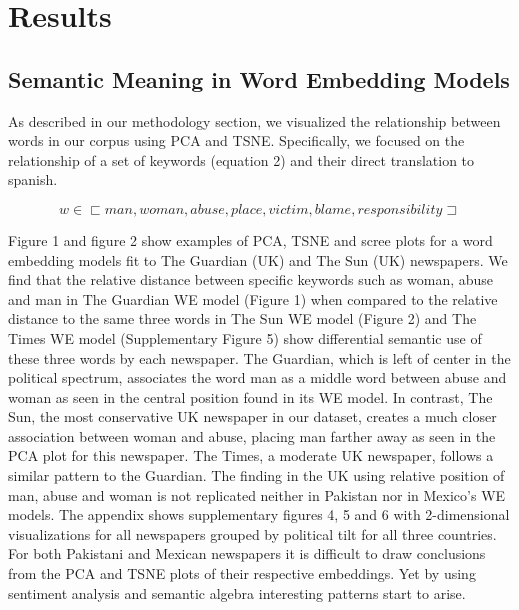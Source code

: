 \documentclass{article}
\begin{document}
\section{Results}{	
\subsection{Semantic Meaning in Word Embedding Models}{
	
As described in our methodology section, we visualized the relationship between words in our corpus using PCA and TSNE. Specifically, we focused on the relationship of a set of keywords (equation 2) and their direct translation to spanish. 

\begin{equation} \label{eu_eqn}
	w \in \sqsubset  {man, woman, abuse, place, victim, blame, responsibility} \sqsupset
\end{equation}

Figure 1 and figure 2 show examples of PCA, TSNE and scree plots for a word embedding models fit to The Guardian (UK) and The Sun (UK) newspapers. We find that the relative distance between specific keywords such as woman, abuse and man in The Guardian WE model (Figure 1) when compared to the relative distance to the same three words in The Sun WE model (Figure 2) and The Times WE model (Supplementary Figure 5) show differential semantic use of these three words by each newspaper. The Guardian, which is left of center in the political spectrum, associates the word man as a middle word between abuse and woman as seen in the central position found in its WE model. In contrast, The Sun, the most conservative  UK newspaper in our dataset, creates a much closer association between woman and abuse, placing man farther away as seen in the PCA plot for this newspaper. The Times, a moderate UK newspaper, follows a similar pattern to the Guardian. The finding in the UK using relative position of man, abuse and woman is not replicated neither in Pakistan nor in Mexico’s WE models. The appendix shows supplementary figures 4, 5 and 6 with 2-dimensional visualizations for all newspapers grouped by political tilt for all three countries. For both Pakistani and Mexican newspapers it is difficult to draw conclusions from the PCA and TSNE plots of their respective embeddings. Yet by using sentiment analysis and semantic algebra interesting patterns start to arise. 

}}
\end{document}
